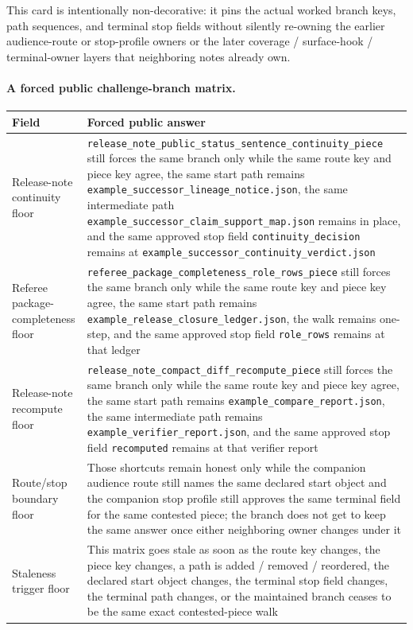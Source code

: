 \documentclass[11pt]{article}
\begin{document}
This card is intentionally non-decorative: it pins the actual worked branch keys, path sequences, and terminal stop fields without silently re-owning the earlier audience-route or stop-profile owners or the later coverage / surface-hook / terminal-owner layers that neighboring notes already own.\cite{series:workedexample}

\paragraph{A forced public challenge-branch matrix.}
\begin{table}[t]
\centering
\small
\begin{tabularx}{\linewidth}{@{}lX@{}}
\toprule
Field & Forced public answer \\
\midrule
Release-note continuity floor & \nolinkurl{release_note_public_status_sentence_continuity_piece} still forces the same branch only while the same route key and piece key agree, the same start path remains \nolinkurl{example_successor_lineage_notice.json}, the same intermediate path \nolinkurl{example_successor_claim_support_map.json} remains in place, and the same approved stop field \nolinkurl{continuity_decision} remains at \nolinkurl{example_successor_continuity_verdict.json} \\
Referee package-completeness floor & \nolinkurl{referee_package_completeness_role_rows_piece} still forces the same branch only while the same route key and piece key agree, the same start path remains \nolinkurl{example_release_closure_ledger.json}, the walk remains one-step, and the same approved stop field \nolinkurl{role_rows} remains at that ledger \\
Release-note recompute floor & \nolinkurl{release_note_compact_diff_recompute_piece} still forces the same branch only while the same route key and piece key agree, the same start path remains \nolinkurl{example_compare_report.json}, the same intermediate path remains \nolinkurl{example_verifier_report.json}, and the same approved stop field \nolinkurl{recomputed} remains at that verifier report \\
Route/stop boundary floor & Those shortcuts remain honest only while the companion audience route still names the same declared start object and the companion stop profile still approves the same terminal field for the same contested piece; the branch does not get to keep the same answer once either neighboring owner changes under it \\
Staleness trigger floor & This matrix goes stale as soon as the route key changes, the piece key changes, a path is added / removed / reordered, the declared start object changes, the terminal stop field changes, the terminal path changes, or the maintained branch ceases to be the same exact contested-piece walk \\

\end{tabularx}
\end{table}
\end{document}
